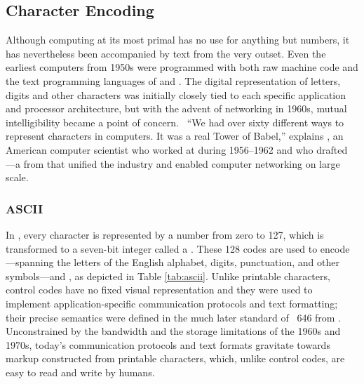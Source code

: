 \documentclass[
  a5paper,10pt,           %
  dvipsnames              %
]{book}
\begin{document}
\subsection{Character Encoding}
Although computing at its most primal has no use for anything but numbers, it
has nevertheless been accompanied by text from the very outset. Even the
earliest computers from 1950s were programmed with both raw machine code and
the text programming languages of  and . The
digital representation of letters, digits and other characters was initially
closely tied to each specific application and processor architecture, but with
the advent of networking in 1960s, mutual intelligibility became a point of
concern.
\ ``We had over sixty different ways to represent characters in
computers. It was a real Tower of Babel,'' explains \cite{brandel99}
, an American computer scientist who worked at 
during 1956--1962 and who drafted ---a
 from \citeyear{asa63} that unified the industry and
enabled computer networking on large scale.

\subsubsection{ASCII}
In , every character is represented by a number from zero to 127,
which is transformed to a seven-bit integer called a .
These 128 codes are used to encode ---spanning the
letters of the English alphabet, digits, punctuation, and other symbols---and
, as depicted in Table \ref{tab:ascii}.  Unlike printable
characters, control codes have no fixed visual representation and they were used
to implement application-specific communication protocols and text formatting;
their precise semantics were defined in the much later standard of
~646 from \citeyear{iso72} \cite{iso72}. Unconstrained by the
bandwidth and the storage limitations of the 1960s and 1970s, today's
communication protocols and text formats gravitate towards markup constructed
from printable characters, which, unlike control codes, are easy to read and
write by humans.
\end{document}

